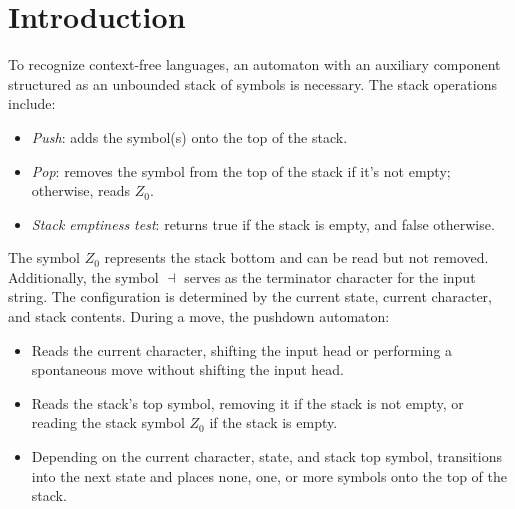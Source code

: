 \section{Introduction}

To recognize context-free languages, an automaton with an auxiliary component structured as an unbounded stack of symbols is necessary. 
The stack operations include:
\begin{itemize}
    \item \textit{Push}: adds the symbol(s) onto the top of the stack.
    \item \textit{Pop}: removes the symbol from the top of the stack if it's not empty; otherwise, reads $Z_0$.
    \item \textit{Stack emptiness test}: returns true if the stack is empty, and false otherwise.
\end{itemize}
The symbol $Z_0$ represents the stack bottom and can be read but not removed. 
Additionally, the symbol $\dashv$ serves as the terminator character for the input string.
The configuration is determined by the current state, current character, and stack contents. 
During a move, the pushdown automaton:
\begin{itemize}
    \item Reads the current character, shifting the input head or performing a spontaneous move without shifting the input head.
    \item Reads the stack's top symbol, removing it if the stack is not empty, or reading the stack symbol $Z_0$ if the stack is empty.
    \item Depending on the current character, state, and stack top symbol, transitions into the next state and places none, one, or more symbols onto the top of the stack.
\end{itemize}


